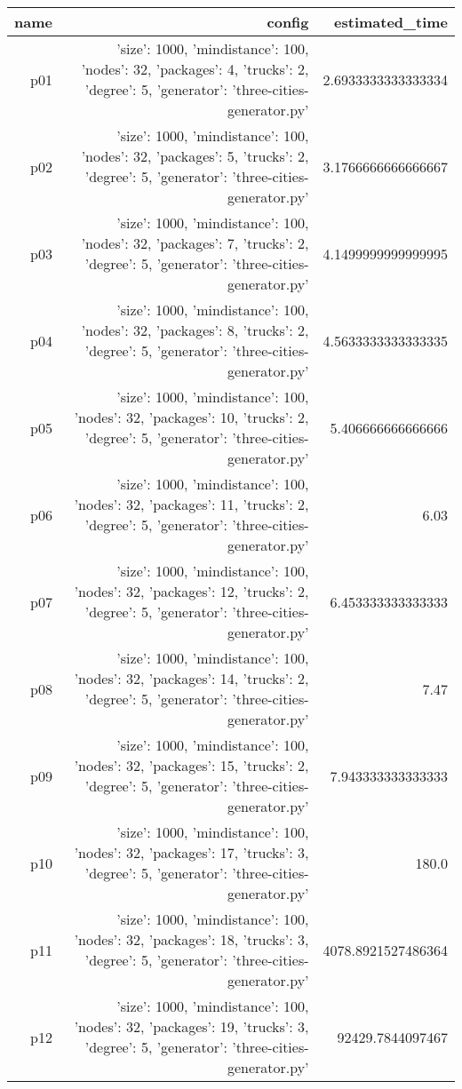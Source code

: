\documentclass{article}
\begin{document}
                            \begin{center}
                            \scriptsize
                            \begin{tabular}{r|r|r}
                            name & config & estimated\_time\\\midrule
                              p01&{'size': 1000, 'mindistance': 100, 'nodes': 32, 'packages': 4, 'trucks': 2, 'degree': 5, 'generator': 'three-cities-generator.py'}&2.6933333333333334\\
  p02&{'size': 1000, 'mindistance': 100, 'nodes': 32, 'packages': 5, 'trucks': 2, 'degree': 5, 'generator': 'three-cities-generator.py'}&3.1766666666666667\\
  p03&{'size': 1000, 'mindistance': 100, 'nodes': 32, 'packages': 7, 'trucks': 2, 'degree': 5, 'generator': 'three-cities-generator.py'}&4.1499999999999995\\
  p04&{'size': 1000, 'mindistance': 100, 'nodes': 32, 'packages': 8, 'trucks': 2, 'degree': 5, 'generator': 'three-cities-generator.py'}&4.5633333333333335\\
  p05&{'size': 1000, 'mindistance': 100, 'nodes': 32, 'packages': 10, 'trucks': 2, 'degree': 5, 'generator': 'three-cities-generator.py'}&5.406666666666666\\
  p06&{'size': 1000, 'mindistance': 100, 'nodes': 32, 'packages': 11, 'trucks': 2, 'degree': 5, 'generator': 'three-cities-generator.py'}&6.03\\
  p07&{'size': 1000, 'mindistance': 100, 'nodes': 32, 'packages': 12, 'trucks': 2, 'degree': 5, 'generator': 'three-cities-generator.py'}&6.453333333333333\\
  p08&{'size': 1000, 'mindistance': 100, 'nodes': 32, 'packages': 14, 'trucks': 2, 'degree': 5, 'generator': 'three-cities-generator.py'}&7.47\\
  p09&{'size': 1000, 'mindistance': 100, 'nodes': 32, 'packages': 15, 'trucks': 2, 'degree': 5, 'generator': 'three-cities-generator.py'}&7.943333333333333\\
  p10&{'size': 1000, 'mindistance': 100, 'nodes': 32, 'packages': 17, 'trucks': 3, 'degree': 5, 'generator': 'three-cities-generator.py'}&180.0\\
  p11&{'size': 1000, 'mindistance': 100, 'nodes': 32, 'packages': 18, 'trucks': 3, 'degree': 5, 'generator': 'three-cities-generator.py'}&4078.8921527486364\\
  p12&{'size': 1000, 'mindistance': 100, 'nodes': 32, 'packages': 19, 'trucks': 3, 'degree': 5, 'generator': 'three-cities-generator.py'}&92429.7844097467\\

\end{tabular}
\end{center}
\end{document}
